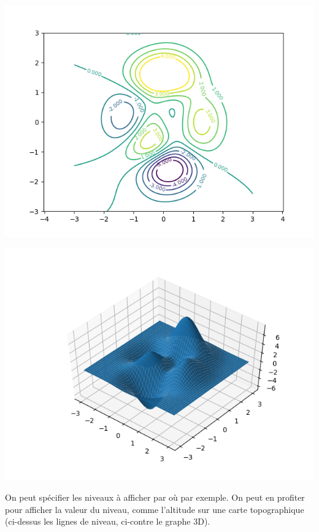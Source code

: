 \documentclass[11pt,class=report,crop=false]{standalone}
\begin{document}
\begin{center}
\includegraphics[scale=\myscale,scale=0.8]{figures/pythonxy-niveau-2d-2}
\end{center}


\begin{minipage}{0.5\textwidth}
\begin{center}
\includegraphics[scale=\myscale,scale=0.5]{figures/pythonxy-niveau-3d-2}
\end{center}
\end{minipage}
\begin{minipage}{0.45\textwidth}
 On peut spécifier les niveaux à afficher par 
   où 
   par exemple.
  On peut en profiter pour afficher la valeur du niveau, comme l'altitude sur une carte topographique (ci-dessus les lignes de niveau, ci-contre le graphe 3D).
\end{minipage}
\end{document}
